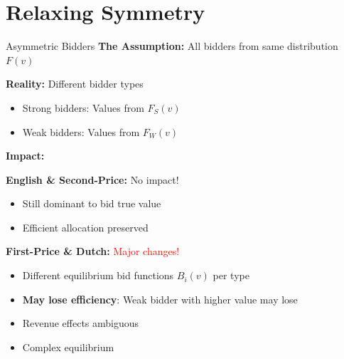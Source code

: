 \documentclass[xcolor={x11names}, aspectratio=169 ]{beamer}
\begin{document}
\section{Relaxing Symmetry}

\begin{frame}{Asymmetric Bidders}
\textbf{The Assumption:} All bidders from same distribution $F(v)$

\textbf{Reality:} Different bidder types
\begin{itemize}
  \item Strong bidders: Values from $F_S(v)$
  \item Weak bidders: Values from $F_W(v)$
\end{itemize}

\textbf{Impact:}

\textbf{English \& Second-Price:} \textcolor{green!70!black}{No impact!}
\begin{itemize}
  \item Still dominant to bid true value
  \item Efficient allocation preserved
\end{itemize}

\textbf{First-Price \& Dutch:} \textcolor{red}{Major changes!}
\begin{itemize}
  \item Different equilibrium bid functions $B_i(v)$ per type
  \item \textbf{May lose efficiency}: Weak bidder with higher value may lose
  \item Revenue effects ambiguous
  \item Complex equilibrium
\end{itemize}
\end{frame}
\end{document}
